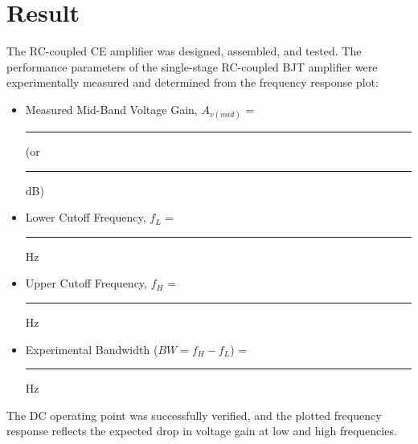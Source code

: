 \section{Result}

The RC-coupled CE amplifier was designed, assembled, and tested. The performance parameters of the single-stage RC-coupled BJT amplifier were experimentally measured and determined from the frequency response plot:
\begin{itemize}
	\item Measured Mid-Band Voltage Gain, $A_{v(mid)}$ = \rule{2cm}{0.15mm} (or \rule{2cm}{0.15mm} dB)
	\item Lower Cutoff Frequency, $f_L$ = \rule{2cm}{0.15mm} Hz
	\item Upper Cutoff Frequency, $f_H$ = \rule{2cm}{0.15mm} Hz
	\item Experimental Bandwidth ($BW = f_H - f_L$) = \rule{2cm}{0.15mm} Hz
\end{itemize}
The DC operating point was successfully verified, and the plotted frequency response reflects the expected drop in voltage gain at low and high frequencies.

